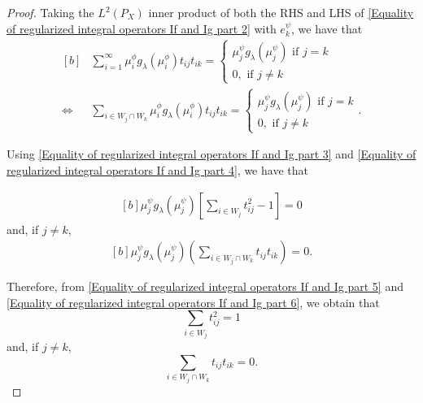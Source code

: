 \documentclass{article} %
\newcommand{\repone}{\phi}
\newcommand{\reptwo}{\psi}
\newcommand{\gl}{g_{\lambda}}
\newcommand{\LPtwo}{L^{2}(P_{X})}
\theoremstyle{plain}
\begin{document}
\begin{proof}
    Taking the $\LPtwo$ inner product of both the RHS and LHS of \eqref{Equality of regularized integral operators If and Ig part 2} with $e_{k}^{\reptwo}$, we have that
    \begin{equation}\label{Equality of regularized integral operators If and Ig part 4}
        \begin{aligned}[b]
        & \sum_{i=1}^{\infty} \mu_{i}^{\repone} \gl(\mu_{i}^{\repone})t_{ij}t_{ik} = \begin{cases}
            \mu_{j}^{\reptwo} \gl(\mu_{j}^{\reptwo}) \textrm{ if } j = k \\
            0, \textrm{ if } j \neq k
        \end{cases} \\
        \iff & \sum_{i \in W_{j} \cap W_{k}}\mu_{i}^{\repone} \gl(\mu_{i}^{\repone})t_{ij}t_{ik} = \begin{cases}
            \mu_{j}^{\reptwo} \gl(\mu_{j}^{\reptwo}) \textrm{ if } j = k \\
            0, \textrm{ if } j \neq k
        \end{cases}.
        \end{aligned}
    \end{equation}

    Using \eqref{Equality of regularized integral operators If and Ig part 3} and \eqref{Equality of regularized integral operators If and Ig part 4}, we have that

    \begin{equation}\label{Equality of regularized integral operators If and Ig part 5}
        \begin{aligned}[b]
        \mu_{j}^{\reptwo}\gl(\mu_{j}^{\reptwo}) \left[ \sum_{i \in W_{j}}t_{ij}^{2} - 1\right] = 0
        \end{aligned}
    \end{equation}
    and, if $j \neq k$,
    \begin{equation}\label{Equality of regularized integral operators If and Ig part 6}
        \begin{aligned}[b]
        \mu_{j}^{\reptwo} \gl(\mu_{j}^{\reptwo})\left( \sum_{i \in W_{j}\cap W_{k}}t_{ij}t_{ik}\right) = 0.
        \end{aligned}
    \end{equation}

    Therefore, from \eqref{Equality of regularized integral operators If and Ig part 5} and \eqref{Equality of regularized integral operators If and Ig part 6}, we obtain that
    \begin{equation}\label{Equality of regularized integral operators If and Ig part 7}
        \sum_{i \in W_{j}}t_{ij}^{2} = 1
    \end{equation}
    and, if $j \neq k$,
    \begin{equation}\label{Equality of regularized integral operators If and Ig part 8}
        \sum_{i \in W_{j}\cap W_{k}}t_{ij}t_{ik}=0.
    \end{equation}


\end{proof}
\end{document}
